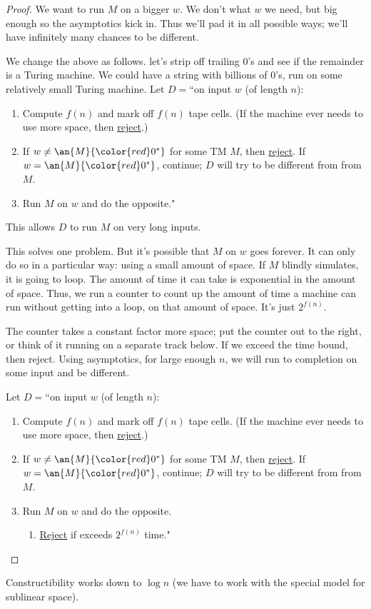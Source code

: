 \begin{proof}
We want to run $M$ on a bigger $w$. We don't what $w$ we need, but big enough so the asymptotics kick in. Thus we'll pad it in all possible ways; we'll have infinitely many chances to be different.

We change the above as follows. let's strip off trailing 0's and see if the remainder is a Turing machine. We could have a string with billions of 0's, run on some relatively small Turing machine.
Let $D=$``on input $w$ (of length $n$):
\begin{enumerate}
\item
Compute $f(n)$ and mark off $f(n)$ tape cells. (If the machine ever needs to use more space, then \ul{reject}.)
\item
If $w\ne\an{M}{\color{red}0^*}$ for some TM $M$, then \ul{reject}.
If $w=\an{M}{\color{red}0^*}$, continue; $D$ will try to be different from from $M$.
\item
Run $M$ on $w$ and do the opposite."
\end{enumerate}
This allows $D$ to run $M$ on very long inputs.

This solves one problem. But it's possible that $M$ on $w$ goes forever. It can only do so in a particular way: using a small amount of space. If $M$ blindly simulates, it is going to loop. The amount of time it can take is exponential in the amount of space. Thus, we run a counter to count up the amount of time a machine can run without getting into a loop, on that amount of space. It's just $2^{f(n)}$. 

The counter takes a constant factor more space; put the counter out to the right, or think of it running on a separate track below. If we exceed the time bound, then reject. %
Using asymptotics, for large enough $n$, we will run to completion on some input and be different.

Let $D=$``on input $w$ (of length $n$):
\begin{enumerate}
\item
Compute $f(n)$ and mark off $f(n)$ tape cells. (If the machine ever needs to use more space, then \ul{reject}.)
\item
If $w\ne\an{M}{\color{red}0^*}$ for some TM $M$, then \ul{reject}.
If $w=\an{M}{\color{red}0^*}$, continue; $D$ will try to be different from from $M$.
\item
Run $M$ on $w$ and do the opposite.
\begin{enumerate}
\item
{\color{red}\ul{Reject} if exceeds $2^{f(n)}$ time.}"
\end{enumerate}
\end{enumerate}
\end{proof}
Constructibility works down to $\log n$ (we have to work with the special model for sublinear space).
